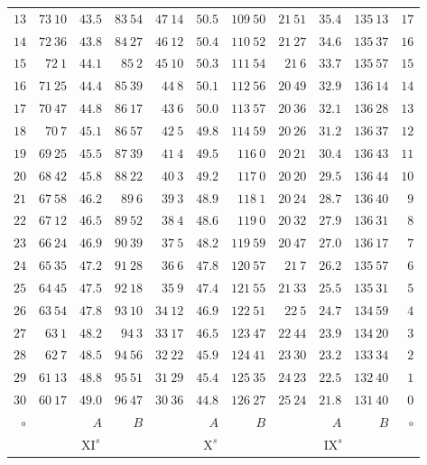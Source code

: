 \begin{center}
\begin{tabular}{r|r|r|r|r|r|r|r|r|r|r}
$13$ & $73\ 10$ & $43.5$ & $83\ 54$ & $47\ 14$ & $50.5$ & $109\ 50$ & $21\ 51$ & $35.4$ & $135\ 13$ & $17$ \\
$14$ & $72\ 36$ & $43.8$ & $84\ 27$ & $46\ 12$ & $50.4$ & $110\ 52$ & $21\ 27$ & $34.6$ & $135\ 37$ & $16$ \\
$15$ & $72\ 1$ & $44.1$ & $85\ 2$ & $45\ 10$ & $50.3$ & $111\ 54$ & $21\ 6$ & $33.7$ & $135\ 57$ & $15$ \\[3pt]
$16$ & $71\ 25$ & $44.4$ & $85\ 39$ & $44\ 8$ & $50.1$ & $112\ 56$ & $20\ 49$ & $32.9$ & $136\ 14$ & $14$ \\
$17$ & $70\ 47$ & $44.8$ & $86\ 17$ & $43\ 6$ & $50.0$ & $113\ 57$ & $20\ 36$ & $32.1$ & $136\ 28$ & $13$ \\
$18$ & $70\ 7$ & $45.1$ & $86\ 57$ & $42\ 5$ & $49.8$ & $114\ 59$ & $20\ 26$ & $31.2$ & $136\ 37$ & $12$ \\
$19$ & $69\ 25$ & $45.5$ & $87\ 39$ & $41\ 4$ & $49.5$ & $116\ 0$ & $20\ 21$ & $30.4$ & $136\ 43$ & $11$ \\
$20$ & $68\ 42$ & $45.8$ & $88\ 22$ & $40\ 3$ & $49.2$ & $117\ 0$ & $20\ 20$ & $29.5$ & $136\ 44$ & $10$ \\[3pt]
$21$ & $67\ 58$ & $46.2$ & $89\ 6$ & $39\ 3$ & $48.9$ & $118\ 1$ & $20\ 24$ & $28.7$ & $136\ 40$ & $9$ \\
$22$ & $67\ 12$ & $46.5$ & $89\ 52$ & $38\ 4$ & $48.6$ & $119\ 0$ & $20\ 32$ & $27.9$ & $136\ 31$ & $8$ \\
$23$ & $66\ 24$ & $46.9$ & $90\ 39$ & $37\ 5$ & $48.2$ & $119\ 59$ & $20\ 47$ & $27.0$ & $136\ 17$ & $7$ \\
$24$ & $65\ 35$ & $47.2$ & $91\ 28$ & $36\ 6$ & $47.8$ & $120\ 57$ & $21\ 7$ & $26.2$ & $135\ 57$ & $6$ \\
$25$ & $64\ 45$ & $47.5$ & $92\ 18$ & $35\ 9$ & $47.4$ & $121\ 55$ & $21\ 33$ & $25.5$ & $135\ 31$ & $5$ \\[3pt]
$26$ & $63\ 54$ & $47.8$ & $93\ 10$ & $34\ 12$ & $46.9$ & $122\ 51$ & $22\ 5$ & $24.7$ & $134\ 59$ & $4$ \\
$27$ & $63\ 1$ & $48.2$ & $94\ 3$ & $33\ 17$ & $46.5$ & $123\ 47$ & $22\ 44$ & $23.9$ & $134\ 20$ & $3$ \\
$28$ & $62\ 7$ & $48.5$ & $94\ 56$ & $32\ 22$ & $45.9$ & $124\ 41$ & $23\ 30$ & $23.2$ & $133\ 34$ & $2$ \\
$29$ & $61\ 13$ & $48.8$ & $95\ 51$ & $31\ 29$ & $45.4$ & $125\ 35$ & $24\ 23$ & $22.5$ & $132\ 40$ & $1$ \\
$30$ & $60\ 17$ & $49.0$ & $96\ 47$ & $30\ 36$ & $44.8$ & $126\ 27$ & $25\ 24$ & $21.8$ & $131\ 40$ & $0$ \\
\hline $\circ$ &  & $A$ & $B$ &  & $A$ & $B$ &  & $A$ & $B$ & $\circ$ \\
 & \multicolumn{3}{c|}{$\mathrm{XI}^s$} & \multicolumn{3}{c|}{$\mathrm{X}^s$} & \multicolumn{3}{c|}{$\mathrm{IX}^s$} & \\
\end{tabular}\endgroup
\end{center}

